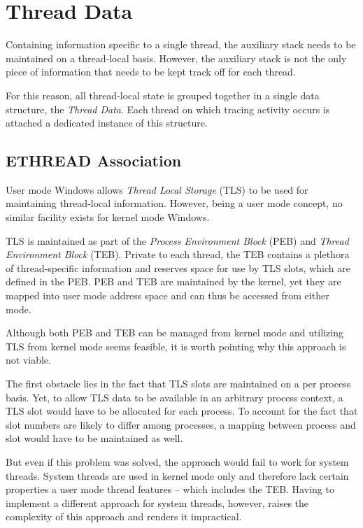 \section{Thread Data}
Containing information specific to a single thread, the auxiliary stack needs
to be maintained on a thread-local basis. However, the auxiliary stack is not
the only piece of information that needs to be kept track off for each thread.

For this reason, all thread-local state is grouped together in a single data 
structure, the \emph{Thread Data}. Each thread on which tracing activity occurs
is attached a dedicated instance of this structure.

\subsection{ETHREAD Association}
User mode Windows allows \emph{Thread Local Storage} (TLS) to be used for 
maintaining thread-local information. However, being a user mode concept,
no similar facility exists for kernel mode Windows.



TLS is maintained as part of the \emph{Process Environment Block} (PEB) and
\emph{Thread Environment Block} (TEB). Private to each thread, the TEB 
contains a plethora of thread-specific information and reserves space for 
use by TLS slots, which are defined in the PEB. PEB and TEB are maintained
by the kernel, yet they are mapped into user mode address space and can thus
be accessed from either mode. 

Although both PEB and TEB can be managed from kernel mode and utilizing TLS
from kernel mode seems feasible, it is worth pointing why this approach is
not viable.

The first obstacle lies in the fact that TLS slots are maintained on a 
per process basis. Yet, to allow TLS data to be available in an arbitrary 
process context, a TLS slot would have to be allocated for each process. To
account for the fact that slot numbers are likely to differ among processes,
a mapping between process and slot would have to be maintained as well.

But even if this problem was solved, the approach would fail to work for
system threads. System threads are used in kernel mode only and therefore
lack certain properties a user mode thread features -- which includes the
TEB. Having to implement a different approach for system threads, however, 
raises the complexity of this approach and renders it impractical.



